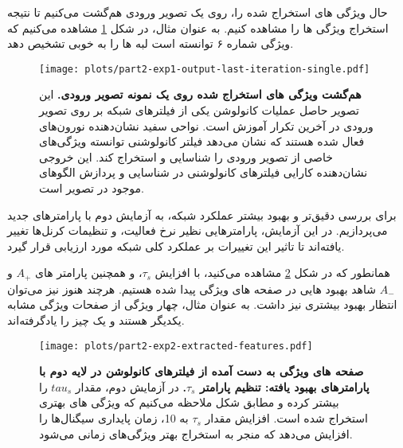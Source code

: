                 حال ویژگی های استخراج شده را، روی یک تصویر ورودی هم‌گشت می‌کنیم تا نتیجه استخراج ویژگی ها را مشاهده کنیم. به عنوان مثال، در شکل 
                \ref{fig:part2-exp1-output-last-iteration-single}
                مشاهده می‌کنیم که ویژگی شماره ۶ توانسته است لبه ها را به خوبی تشخیص دهد.

                \begin{figure}[!ht]
                    \centering
                    \texttt{[image: plots/part2-exp1-output-last-iteration-single.pdf]} 
                    \captionsetup{width=.9\linewidth}
                    \caption{\textbf{ هم‌گشت ویژگی های استخراج شده روی یک نمونه تصویر ورودی.}  این تصویر حاصل عملیات کانولوشن یکی از فیلترهای شبکه بر روی تصویر ورودی در آخرین تکرار آموزش است. نواحی سفید نشان‌دهنده نورون‌های فعال شده هستند که نشان می‌دهد فیلتر کانولوشنی توانسته ویژگی‌های خاصی از تصویر ورودی را شناسایی و استخراج کند. این خروجی نشان‌دهنده کارایی فیلترهای کانولوشنی در شناسایی و پردازش الگوهای موجود در تصویر است.
                    }
                    \label{fig:part2-exp1-output-last-iteration-single}
                \end{figure}

                برای بررسی دقیق‌تر و بهبود بیشتر عملکرد شبکه، به آزمایش دوم با پارامترهای جدید می‌پردازیم. در این آزمایش، پارامترهایی نظیر نرخ فعالیت، و تنظیمات کرنل‌ها تغییر یافته‌اند تا تاثیر این تغییرات بر عملکرد کلی شبکه مورد ارزیابی قرار گیرد. 
            
                همانطور که در شکل 
                \ref{fig:part2-exp2-extracted-features}
                مشاهده می‌کنید، با افزایش 
                $\tau_s$، 
                و همچنین پارامتر های 
                $A_{+}$ و $A_{-}$ 
                شاهد بهبود هایی در صفحه های ویژگی پیدا شده هستیم. هرچند هنوز نیز می‌توان انتظار بهبود بیشتری نیز داشت. به عنوان مثال، چهار ویژگی از صفحات ویژگی مشابه یکدیگر هستند و یک چیز را یادگرفته‌اند. 

                \begin{figure}[!ht]
                    \centering
                    \texttt{[image: plots/part2-exp2-extracted-features.pdf]} 
                    \captionsetup{width=.9\linewidth}
                    \caption{\textbf{ صفحه های ویژگی به دست آمده از فیلترهای کانولوشن در لایه دوم با پارامترهای بهبود یافته: تنظیم پارامتر $\tau_s$. } در آزمایش دوم، مقدار 
                    $tau_s$ را بیشتر کرده و مطابق شکل ملاحظه می‌کنیم که ویژگی های بهتری استخراج شده است.
                    افزایش مقدار 
                    $\tau_s$ 
                    به 10، زمان پایداری سیگنال‌ها را افزایش می‌دهد که منجر به استخراج بهتر ویژگی‌های زمانی می‌شود.
                    }
                    \label{fig:part2-exp2-extracted-features}
                \end{figure}

